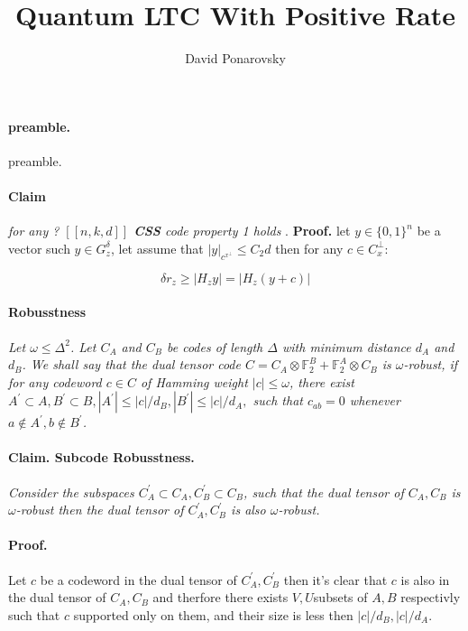 \documentclass{article}
\newcommand{\Gz}{ G_{z}^{\delta} }
\begin{document}
\title{Quantum LTC With Positive Rate}
\author{David Ponarovsky}
\maketitle
\begin{multicols*}{2}


  \paragraph{preamble.} preamble.  
  \paragraph{Claim} \textit{ for any ?  $ \left[ \left[ n,k,d \right] \right] $ \textbf{CSS} code property 1 holds }. 
\textbf{Proof.} let $y \in \{0,1\}^{n}$ be a vector such $ y \in \Gz $, let assume that $|y|_{c^{x^{\perp}}} \le C_{2} d$ then for any $ c \in C_{x}^{\perp}$: 

\begin{equation*}
    \delta r_z \ge | H_{z} y | = | H_{z} \left( y + c \right) |  
\end{equation*}
\paragraph{Robusstness} \textit{ Let $ \omega \le \Delta^{2}$. Let $C_{A}$ and $C_{B}$ be codes of length $\Delta$ with minimum distance $d_{A}$ and $d_{B}$. We shall say that the dual tensor code $C = C_{A}\otimes \mathbb{F}^{B}_{2} + \mathbb{F}^{A}_{2} \otimes C_{B}$ is $\omega$-robust, if for any codeword $c\in C$ of Hamming weight $|c|\le \omega$, there exist $A^{\prime}\subset A, B^{\prime}\subset B, |A^{\prime}|\le |c|/d_{B}, |B^{\prime}|\le |c|/d_{A},$ such that $c_{ab}=0$ whenever $a \notin A^{\prime}, b \notin B^{\prime}$.} 
\paragraph{Claim. Subcode Robusstness.} \textit{ Consider the subspaces $C_{A}^{\prime}\subset C_{A}, C_{B}^{\prime}\subset C_{B}$, such that the dual tensor of $C_{A}, C_{B}$ is $\omega$-robust then the dual tensor of $C_{A}^{\prime}, C_{B}^{\prime}$ is also $\omega$-robust.} 
\paragraph{Proof.} Let $c$ be a codeword in the dual tensor of $C_{A}^{\prime},C_{B}^{\prime}$ then it's clear that $c$ is also in the dual tensor of $C_{A}, C_{B}$ and therfore there exists $V,U$subsets of $A,B$ respectivly such that $c$ supported only on them, and their size is less then $|c|/d_{B}, |c|/d_{A}$.  
\end{multicols*}
\end{document}

